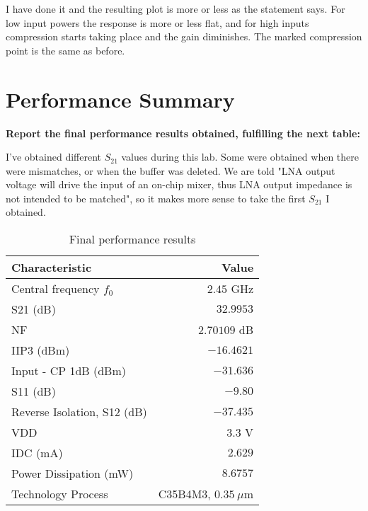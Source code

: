 \noindent I have done it and the resulting plot is more or less as the statement says. For low input powers the response is more or less flat, and for high inputs compression starts taking place and the gain diminishes. The marked compression point is the same as before.




\section{Performance Summary}
\begin{pexbox}{}
   \noindent \textbf{Report the final performance results obtained, fulfilling the next table:}
\end{pexbox}

\noindent I've obtained different $S_{21}$ values during this lab. Some were obtained when there were mismatches, or when the buffer was deleted. We are told "LNA output voltage will drive the input of an on-chip mixer, thus LNA output impedance is not intended to be matched", so it makes more sense to take the first $S_{21}$ I obtained.
\begin{table}[H] \centering
   \begin{tabular}{ |l|r| } \hline
       Characteristic & Value \\ \hline \hline
       Central frequency $f_0$ & $2.45$ GHz \\ \hline %
       S21 (dB) & $32.9953$  \\ \hline %
       NF & $2.70109$ dB \\ \hline
       IIP3 (dBm) & $-16.4621$ \\ \hline
       Input - CP 1dB (dBm) & $-31.636$ \\ \hline
       S11 (dB) &  $-9.80$ \\ \hline
       Reverse Isolation, S12 (dB) & $-37.435$ \\ \hline
       VDD & $3.3$ V \\ \hline
       IDC (mA) & $2.629$ \\ \hline
       Power Dissipation (mW) & $8.6757$ \\ \hline
       Technology Process & C35B4M3, $0.35 \ \mu$m \\ \hline
   \end{tabular}
   \caption{Final performance results}
\end{table}


